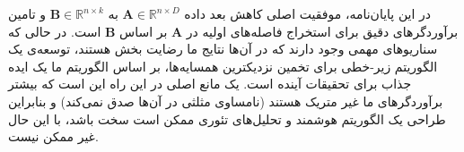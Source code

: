 در این پایان‌نامه، موفقیت اصلی کاهش بعد داده 
$\mathbf{A} \in \mathbb{R}^{n \times D}$
به
$\mathbf{B} \in \mathbb{R}^{n \times k}$
و تامین برآوردگرهای دقیق برای استخراج فاصله‌های اولیه در 
$\mathbf{A}$
بر اساس
$\mathbf{B}$
است. در حالی که سناریوهای مهمی وجود دارند که در آن‌ها نتایج ما رضایت بخش هستند، توسعه‌ی یک الگوریتم زیر-خطی برای تخمین نزدیکترین همسایه‌ها، بر اساس الگوریتم ما یک ایده جذاب برای تحقیقات آینده است. یک مانع اصلی در این راه این است که  بیشتر برآوردگرهای ما غیر متریک هستند (نامساوی مثلثی در آن‌ها صدق نمی‌کند) و بنابراین طراحی یک الگوریتم هوشمند و تحلیل‌های تئوری ممکن است سخت باشد، با این حال غیر ممکن نیست.






